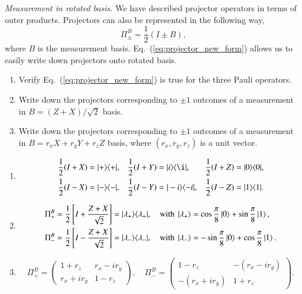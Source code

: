 \begin{exercise}
\emph{Measurement in rotated basis.} We have described projector operators in terms of outer products. Projectors can also be represented in the following way,
\begin{equation}
    \Pi^B_{\pm} = \frac{1}{2} (I \pm B),
    \label{eq:projector_new_form}
\end{equation}
where $B$ is the measurement basis.
Eq.~(\ref{eq:projector_new_form}) allows us to easily write down projectors onto rotated basis.
\begin{enumerate}[label=(\alph*)]
    \item Verify Eq.~(\ref{eq:projector_new_form}) is true for the three Pauli operators.
    \item Write down the projectors corresponding to $\pm 1$ outcomes of a measurement in $B = (Z+X)/\sqrt{2}$ basis.
    \item Write down the projectors corresponding to $\pm 1$ outcomes of a measurement in $B = r_x X + r_y Y + r_z Z$ basis, where $(r_x,r_y,r_z)$ is a unit vector.
\end{enumerate}
\end{exercise}
\begin{solution}
\begin{enumerate}[label=(\alph*)]
    \item 
    \begin{align*}
        \frac{1}{2}(I+X) & = |+\rangle\langle+|, & \frac{1}{2}(I+Y) & = | i\rangle\langle\i|, & \frac{1}{2}(I+Z) & = |0\rangle\langle0|, \\
        \frac{1}{2}(I-X) & = |-\rangle\langle-|, & \frac{1}{2}(I-Y) & = |-i\rangle\langle-i|, & \frac{1}{2}(I-Z) & = |1\rangle\langle1|.
    \end{align*}
    \item
    \begin{align*}
        \Pi^B_+ & = \frac{1}{2}\left[ I +\frac{Z+X}{\sqrt{2}} \right] = |\lambda_+\rangle\langle\lambda_+|, \quad\text{with }\ket{\lambda_+} = \cos\frac{\pi}{8}\ket{0} + \sin\frac{\pi}{8}\ket{1}, \\
        \Pi^B_- & = \frac{1}{2}\left[ I -\frac{Z+X}{\sqrt{2}} \right] = |\lambda_-\rangle\langle\lambda_-|, \quad\text{with }\ket{\lambda_-} = -\sin\frac{\pi}{8}\ket{0} + \cos\frac{\pi}{8}\ket{1}.
    \end{align*}
    \item 
    \begin{equation*}
        \Pi^B_+ =
        \begin{pmatrix}
            1 + r_z & r_x -i r_y \\
            r_x + i r_y & 1 - r_z
        \end{pmatrix}, \quad
        \Pi^B_- =
        \begin{pmatrix}
            1 - r_z & -(r_x - i r_y) \\
            -(r_x + i r_y) & 1 + r_z
        \end{pmatrix}.
    \end{equation*}
\end{enumerate}
\end{solution}

